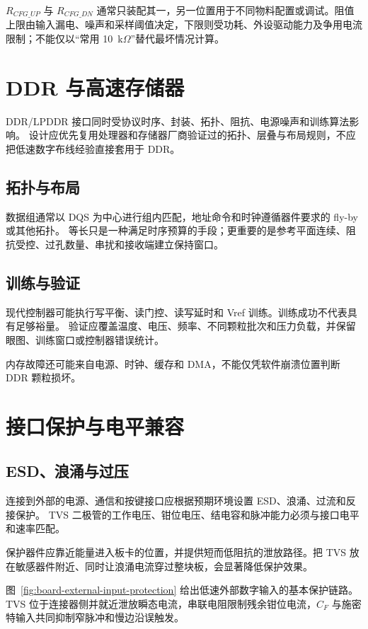 $R_{CFG\_UP}$ 与 $R_{CFG\_DN}$ 通常只装配其一，另一位置用于不同物料配置或调试。阻值上限由输入漏电、噪声和采样阈值决定，下限则受功耗、外设驱动能力及争用电流限制；不能仅以“常用 10~k$\Omega$”替代最坏情况计算。

\section{DDR 与高速存储器}

DDR/LPDDR 接口同时受协议时序、封装、拓扑、阻抗、电源噪声和训练算法影响。
设计应优先复用处理器和存储器厂商验证过的拓扑、层叠与布局规则，不应把低速数字布线经验直接套用于 DDR。

\subsection{拓扑与布局}

数据组通常以 DQS 为中心进行组内匹配，地址命令和时钟遵循器件要求的 fly-by 或其他拓扑。
等长只是一种满足时序预算的手段；更重要的是参考平面连续、阻抗受控、过孔数量、串扰和接收端建立保持窗口。

\subsection{训练与验证}

现代控制器可能执行写平衡、读门控、读写延时和 Vref 训练。训练成功不代表具有足够裕量。
验证应覆盖温度、电压、频率、不同颗粒批次和压力负载，并保留眼图、训练窗口或控制器错误统计。

内存故障还可能来自电源、时钟、缓存和 DMA，不能仅凭软件崩溃位置判断 DDR 颗粒损坏。

\section{接口保护与电平兼容}

\subsection{ESD、浪涌与过压}

连接到外部的电源、通信和按键接口应根据预期环境设置 ESD、浪涌、过流和反接保护。
TVS 二极管的工作电压、钳位电压、结电容和脉冲能力必须与接口电平和速率匹配。

保护器件应靠近能量进入板卡的位置，并提供短而低阻抗的泄放路径。把 TVS 放在敏感器件附近、同时让浪涌电流穿过整块板，会显著降低保护效果。

图~\ref{fig:board-external-input-protection} 给出低速外部数字输入的基本保护链路。TVS 位于连接器侧并就近泄放瞬态电流，串联电阻限制残余钳位电流，$C_F$ 与施密特输入共同抑制窄脉冲和慢边沿误触发。

